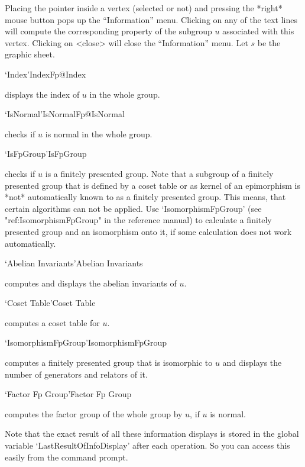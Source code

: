 Placing the pointer  inside a vertex (selected  or not) and  pressing the
*right* mouse button pops up the ``Information''  menu.  Clicking on any of
the text  lines will compute the corresponding   property of the subgroup
$u$  associated  with this  vertex. Clicking  on <close>  will  close the
``Information'' menu.  Let $s$ be the graphic sheet.

\>`Index'{IndexFp}@{Index}

displays  the index of  $u$ in the whole  group.

\>`IsNormal'{IsNormalFp}@{IsNormal}

checks  if $u$ is  normal  in the  whole group.

\>`IsFpGroup'{IsFpGroup}

checks if $u$ is a finitely presented group. Note that a subgroup of a
finitely presented group that is defined by a coset table or as kernel
of an epimorphism is *not* automatically known to {\GAP} as a finitely
presented group. This means, that certain algorithms can not be
applied. Use `IsomorphismFpGroup' (see "ref:IsomorphismFpGroup" in the
{\GAP} reference manual) to calculate a finitely presented group and
an isomorphism onto it, if some calculation does not work automatically.

\>`Abelian Invariants'{Abelian Invariants}

computes  and  displays  the  abelian invariants  of  $u$.

\>`Coset Table'{Coset Table}

computes   a   coset table for   $u$.

\>`IsomorphismFpGroup'{IsomorphismFpGroup}

computes a finitely presented group that is isomorphic to $u$ and displays
the number of generators and relators of it.

\>`Factor Fp Group'{Factor Fp Group}

computes the factor group  of the whole group by $u$, if $u$ is normal.

\bigskip

Note that the exact result of all these information displays is stored in
the global variable `LastResultOfInfoDisplay' after each operation. So you
can access this easily from the {\GAP} command prompt.



